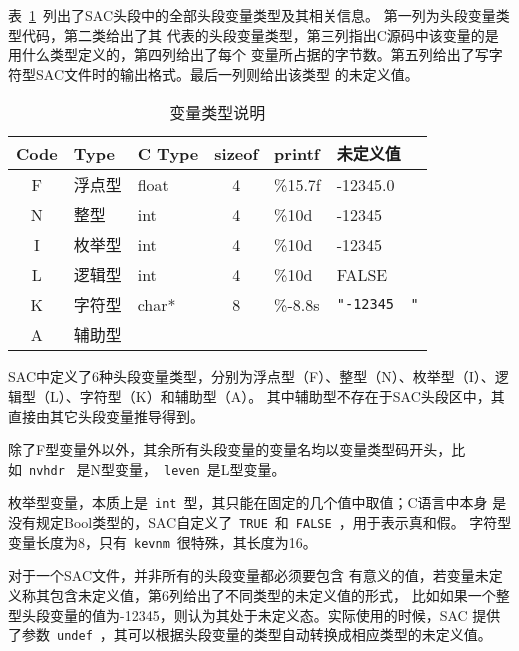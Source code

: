 表~\ref{table:header-variables-type}~列出了SAC头段中的全部头段变量类型及其相关信息。
第一列为头段变量类型代码，第二类给出了其
代表的头段变量类型，第三列指出C源码中该变量的是用什么类型定义的，第四列给出了每个
变量所占据的字节数。第五列给出了写字符型SAC文件时的输出格式。最后一列则给出该类型
的未定义值。

\begin{table}[H]
\caption{变量类型说明}
\label{table:header-variables-type}
\centering
\ttfamily
\small
\begin{tabular}{cllcll}
	\toprule
    Code    &	Type        &   C Type & sizeof &   printf	&   未定义值        \\
	\midrule
    F		&	浮点型		&   float  &  4     &	\%15.7f &   -12345.0        \\
    N		&	整型		&   int    &  4     &	\%10d   &   -12345        \\
    I		&	枚举型		&   int    &  4     &	\%10d   &   -12345	        \\
    L		&	逻辑型		&   int    &  4     &	\%10d   &   FALSE        \\
    K		&	字符型		&   char*  &  8     &	\%-8.8s & \lstinline[showspaces=true]{"-12345  "}     \\
    A		&	辅助型		&          &        &			& 	    \\
	\bottomrule
\end{tabular}
\end{table}

SAC中定义了6种头段变量类型，分别为浮点型（F）、整型（N）、枚举型（I）、逻辑型（L）、字符型（K）和辅助型（A）。
其中辅助型不存在于SAC头段区中，其直接由其它头段变量推导得到。

除了F型变量外以外，其余所有头段变量的变量名均以变量类型码开头，比如~\verb+nvhdr+~
是N型变量，~\verb+leven+~是L型变量。

枚举型变量，本质上是~\verb+int+~型，其只能在固定的几个值中取值；C语言中本身
是没有规定Bool类型的，SAC自定义了~\verb+TRUE+~和~\verb+FALSE+~，用于表示真和假。
字符型变量长度为8，只有~\verb+kevnm+~很特殊，其长度为16。

对于一个SAC文件，并非所有的头段变量都必须要包含
有意义的值，若变量未定义称其包含未定义值，第6列给出了不同类型的未定义值的形式，
比如如果一个整型头段变量的值为-12345，则认为其处于未定义态。实际使用的时候，SAC
提供了参数~\verb+undef+~，其可以根据头段变量的类型自动转换成相应类型的未定义值。
